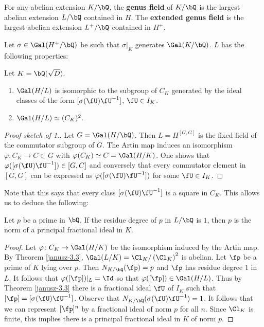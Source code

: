 \begin{defn}
    For any abelian extension $K / \bQ$, the \textbf{genus field} of $K / \bQ$ is the largest abelian extension $L / \bQ$ contained in $H$. The \textbf{extended genus field } is the largest abelian extension $L^{+} / \bQ $ contained in $H^{+}$.
\end{defn}

Let $\sigma \in \Gal(H^{+} / \bQ)$ be such that $\sigma|_{K}$ generates $\Gal(K / \bQ)$. $L$ has the following properties:

\begin{thm}\cite[Ch. VI, $\S$3, Theorem 3.3]{Janusz}\label{janusz-3.3}
    Let $K = \bQ(\sqrt{D})$.
    \begin{enumerate}
        \item $\Gal(H / L)$ is isomorphic to the subgroup of $C_K$ generated by the ideal classes of the form $[\sigma(\fU)\fU^{-1}]$, $\fU \in I_K$. 
        \item $\Gal(H / L) \simeq (C_K)^2$. 
    \end{enumerate}
\end{thm}

\begin{proof}[Proof sketch of 1.]
    Let $G = \Gal(H / \bQ)$. Then $L = H^{[G, G]}$ is the fixed field of the commutator subgroup of $G$. The Artin map induces an isomorphism $\varphi \colon C_K \to C \subset G$ with $\varphi(C_K) \simeq C = \Gal(H / K)$. One shows that $\varphi([\sigma(\fU)\fU^{-1}]) \in [G, C]$ and conversely that every commutator element in $[G, G]$ can be expressed as $\varphi([\sigma(\fU)\fU^{-1}])$ for some $\fU \in I_K$. 
\end{proof}

Note that this says that every class $[\sigma(\fU) \fU^{-1}]$ is a square in $C_K$.
This allows us to deduce the following:

\begin{thm}\label{p-principal}
Let $p$ be a prime in $\bQ$. If the residue degree of $p$ in $L / \bQ$ is $1$, then $p$ is the norm of a principal fractional ideal in $K$. 
\end{thm} 

\begin{proof}
Let $\varphi \colon C_K \to \Gal(H / K)$ be the isomorphism induced by the Artin map. By Theorem \ref{janusz-3.3}, $\Gal(L / K) = \Cl_K / \left(\Cl_K\right)^2$ is abelian. Let $\fp$ be a prime of $K$ lying over $p$. Then $N_{K / \bQ}(\fp) = p$ and $\fp$ has residue degree $1$ in $L$. It follows that $\varphi([\fp])|_{L} = \Id$ so that $\varphi([\fp]) \in \Gal(H / L)$. Thus by Theorem \ref{janusz-3.3} there is a fractional ideal $\fU$ of $I_K$ such that 
$[\fp] = [\sigma(\fU)\fU^{-1}]$. Observe that $N_{K / \bQ}(\sigma(\fU)\fU^{-1}) = 1$. It follows that we can represent $[\fp]^n$ by a fractional ideal of norm $p$ for all $n$. Since $\Cl_K$ is finite, this implies there is a principal fractional ideal in $K$ of norm $p$. 
\end{proof}

